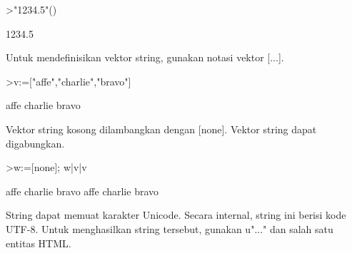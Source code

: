 \documentclass{article}
\newenvironment{eulernotebook}{\par}{\par}
\newenvironment{eulercomment}{\par\medskip}{\par\medskip}
\begin{document}
\begin{eulernotebook}
\begin{eulerprompt}
>"1234.5"()
\end{eulerprompt}
\begin{euleroutput}
  1234.5
\end{euleroutput}
\begin{eulercomment}
Untuk mendefinisikan vektor string, gunakan notasi vektor [...].
\end{eulercomment}
\begin{eulerprompt}
>v:=["affe","charlie","bravo"]
\end{eulerprompt}
\begin{euleroutput}
  affe
  charlie
  bravo
\end{euleroutput}
\begin{eulercomment}
Vektor string kosong dilambangkan dengan [none]. Vektor string dapat
digabungkan.
\end{eulercomment}
\begin{eulerprompt}
>w:=[none]; w|v|v
\end{eulerprompt}
\begin{euleroutput}
  affe
  charlie
  bravo
  affe
  charlie
  bravo
\end{euleroutput}
\begin{eulercomment}
String dapat memuat karakter Unicode. Secara internal, string ini
berisi kode UTF-8. Untuk menghasilkan string tersebut, gunakan u"..."
dan salah satu entitas HTML.



\end{eulercomment}
\end{eulernotebook}
\end{document}
